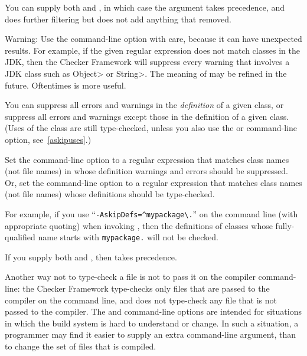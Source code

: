 You can supply both  and , in which case
the  argument takes precedence, and  does
further filtering but does not add anything that  removed.

Warning:  Use the  command-line option with care,
because it can have unexpected results.  For example, if the
given regular expression does not match classes in the JDK, then the
Checker Framework will suppress every warning that involves a JDK class
such as \<Object> or \<String>.  The meaning of  may be
refined in the future.  Oftentimes  is more useful.




You can suppress all errors and warnings in the \emph{definition} of a given
class, or suppress all errors and warnings except those in the definition
of a given class.  (Uses of the class are still type-checked, unless you also use
the  or  command-line option,
see~\ref{askipuses}.)

Set the  command-line option to a
regular expression that matches class names (not file names) in whose definition warnings and errors
should be suppressed.
Or, set the  command-line option to a
regular expression that matches class names (not file names) whose
definitions should be type-checked.

For example, if you use
``{\codesize\verb|-AskipDefs=^mypackage\.|}'' on the command line
(with appropriate quoting) when invoking
, then the definitions of
classes whose fully-qualified name starts with \codesize\verb|mypackage.|
will not be checked.

If you supply both  and , then
 takes precedence.

Another way not to type-check a file is not to pass it on the compiler
command-line:  the Checker Framework type-checks only files that are passed
to the compiler on the command line, and does not type-check any file that
is not passed to the compiler.  The  and 
command-line options
are intended for situations in which the build system is hard to understand
or change.  In such a situation, a programmer may find it easier to supply
an extra command-line argument, than to change the set of files that is
compiled.

